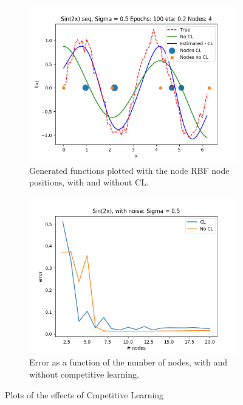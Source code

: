 \documentclass{article}
\begin{document}
\begin{figure}[ht!]
    \centering
    \begin{subfigure}[t]{0.4\textwidth}
        \centering
        \includegraphics[width=1\textwidth]{plots/cl/sin2x_seq_CL_vs_no_cl_plots}
        \caption{Generated functions plotted with the node RBF node positions, with and without CL.}
    \end{subfigure}
    \begin{subfigure}[t]{0.4\textwidth}
        \centering
        \includegraphics[width=1\textwidth]{plots/cl/sin2x_seq_CL_vs_no_cl_plots_error}
        \caption{Error as a function of the number of nodes, with and without competitive learning.}
    \end{subfigure}
    \caption{Plots of the effects of Cmpetitive Learning}
\end{figure}
\end{document}
